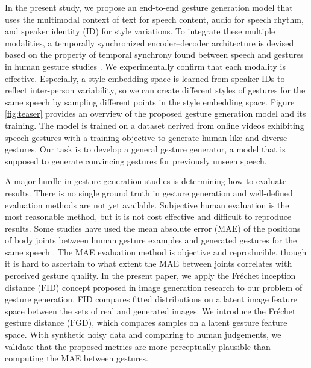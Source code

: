 \documentclass[acmtog]{acmart}
\begin{document}
In the present study, we propose an end-to-end gesture generation model that uses the multimodal context of text for speech content, audio for speech rhythm, and speaker identity (ID) for style variations. To integrate these multiple modalities, a temporally synchronized encoder--decoder architecture is devised based on the property of temporal synchrony found between speech and gestures in human gesture studies \cite{mcneill2008gesture, chu2014synchronization}. We experimentally confirm that each modality is effective. Especially, a style embedding space is learned from speaker IDs to reflect inter-person variability, so we can create different styles of gestures for the same speech by sampling different points in the style embedding space. Figure \ref{fig:teaser} provides an overview of the proposed gesture generation model and its training. The model is trained on a dataset derived from online videos exhibiting speech gestures with a training objective to generate human-like and diverse gestures. Our task is to develop a general gesture generator, a model that is supposed to generate convincing gestures for previously unseen speech.

A major hurdle in gesture generation studies is determining how to evaluate results. There is no single ground truth in gesture generation and well-defined evaluation methods are not yet available. Subjective human evaluation is the most reasonable method, but it is not cost effective and difficult to reproduce results. Some studies have used the mean absolute error (MAE) of the positions of body joints between human gesture examples and generated gestures for the same speech \cite{ginosar2019gestures, joo2019towards}. The MAE evaluation method is objective and reproducible, though it is hard to ascertain to what extent the MAE between joints correlates with perceived gesture quality. In the present paper, we apply the Fr\'{e}chet inception distance (FID) concept proposed in image generation research \cite{heusel2017gans} to our problem of gesture generation. FID compares fitted distributions on a latent image feature space between the sets of real and generated images. We introduce the Fr\'{e}chet gesture distance (FGD), which compares samples on a latent gesture feature space. With synthetic noisy data and comparing to human judgements, we validate that the proposed metrics are more perceptually plausible than computing the MAE between gestures. 
\end{document}
